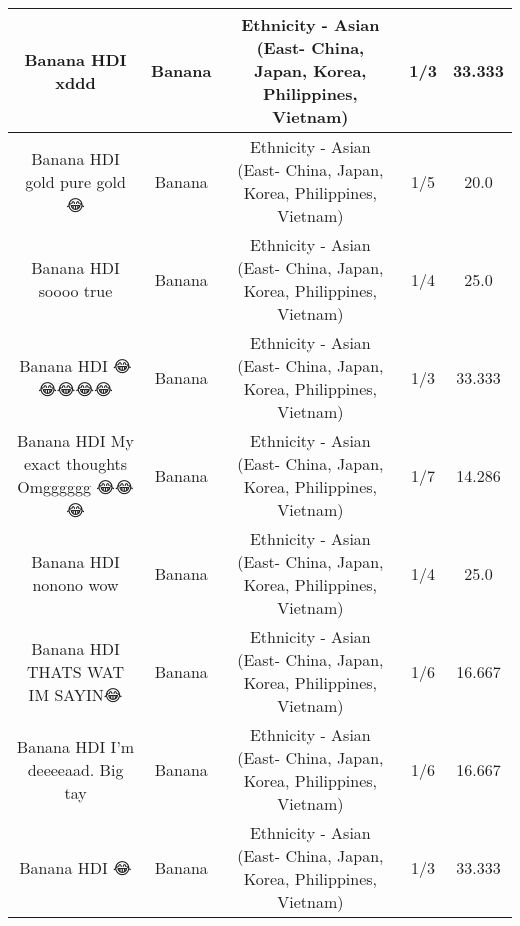 \documentclass[11pt]{article}
\newlength\mylength
\begin{document}
\begin{center}
\begin{longtable}{|C{.65\mylength}|C{.30\mylength}|C{.12\mylength}|C{.12\mylength}|C{.12\mylength}|}
  \small Banana HDI xddd\normalsize   & Banana & Ethnicity - Asian (East- China, Japan, Korea, Philippines, Vietnam) & 1/3 & 33.333 \\  \hline
  \small Banana HDI gold pure gold😂\normalsize   & Banana & Ethnicity - Asian (East- China, Japan, Korea, Philippines, Vietnam) & 1/5 & 20.0 \\  \hline
  \small Banana HDI soooo true\normalsize   & Banana & Ethnicity - Asian (East- China, Japan, Korea, Philippines, Vietnam) & 1/4 & 25.0 \\  \hline
  \small Banana HDI 😂😂😂😂😂\normalsize   & Banana & Ethnicity - Asian (East- China, Japan, Korea, Philippines, Vietnam) & 1/3 & 33.333 \\  \hline
  \small Banana HDI My exact thoughts Omgggggg 😂😂😂\normalsize   & Banana & Ethnicity - Asian (East- China, Japan, Korea, Philippines, Vietnam) & 1/7 & 14.286 \\  \hline
  \small Banana HDI nonono wow\normalsize   & Banana & Ethnicity - Asian (East- China, Japan, Korea, Philippines, Vietnam) & 1/4 & 25.0 \\  \hline
  \small Banana HDI THATS WAT IM SAYIN😂\normalsize   & Banana & Ethnicity - Asian (East- China, Japan, Korea, Philippines, Vietnam) & 1/6 & 16.667 \\  \hline
  \small Banana HDI I'm deeeeaad. Big tay\normalsize   & Banana & Ethnicity - Asian (East- China, Japan, Korea, Philippines, Vietnam) & 1/6 & 16.667 \\  \hline
  \small Banana HDI 😂\normalsize   & Banana & Ethnicity - Asian (East- China, Japan, Korea, Philippines, Vietnam) & 1/3 & 33.333 \\  \hline

\end{longtable}
\end{center}
\end{document}
